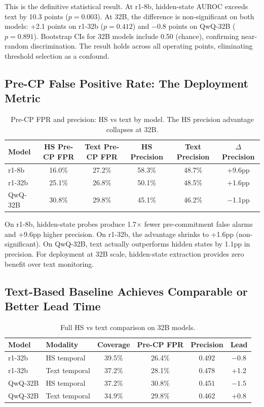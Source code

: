 \documentclass[11pt]{article}
\begin{document}
This is the definitive statistical result. At r1-8b, hidden-state AUROC exceeds text by 10.3 points ($p{=}0.003$). At 32B, the difference is non-significant on both models: +2.1 points on r1-32b ($p{=}0.412$) and $-$0.8 points on QwQ-32B ($p{=}0.891$). Bootstrap CIs for 32B models include 0.50 (chance), confirming near-random discrimination. The result holds across all operating points, eliminating threshold selection as a confound.

\subsection{Pre-CP False Positive Rate: The Deployment Metric}

\begin{table}[h]
\centering
\caption{Pre-CP FPR and precision: HS vs text by model. The HS precision advantage collapses at 32B.}
\label{tab:fpr}
\small
\begin{tabular}{lccccc}
\toprule
Model & HS Pre-CP FPR & Text Pre-CP FPR & HS Precision & Text Precision & $\Delta$ Precision \\
\midrule
r1-8b & 16.0\% & 27.2\% & 58.3\% & 48.7\% & +9.6pp \\
r1-32b & 25.1\% & 26.8\% & 50.1\% & 48.5\% & +1.6pp \\
QwQ-32B & 30.8\% & 29.8\% & 45.1\% & 46.2\% & $-$1.1pp \\
\bottomrule
\end{tabular}
\end{table}

On r1-8b, hidden-state probes produce 1.7$\times$ fewer pre-commitment false alarms and +9.6pp higher precision. On r1-32b, the advantage shrinks to +1.6pp (non-significant). On QwQ-32B, text actually outperforms hidden states by 1.1pp in precision. For deployment at 32B scale, hidden-state extraction provides zero benefit over text monitoring.

\subsection{Text-Based Baseline Achieves Comparable or Better Lead Time}

\begin{table}[h]
\centering
\caption{Full HS vs text comparison on 32B models.}
\label{tab:text_full}
\small
\begin{tabular}{llcccc}
\toprule
Model & Modality & Coverage & Pre-CP FPR & Precision & Lead \\
\midrule
r1-32b & HS temporal & 39.5\% & 26.4\% & 0.492 & $-0.8$ \\
r1-32b & Text temporal & 37.2\% & 28.1\% & 0.478 & +1.2 \\
\midrule
QwQ-32B & HS temporal & 37.2\% & 30.8\% & 0.451 & $-1.5$ \\
QwQ-32B & Text temporal & 34.9\% & 29.8\% & 0.462 & +0.8 \\
\bottomrule
\end{tabular}
\end{table}
\end{document}
